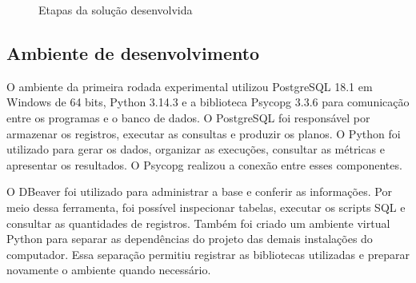 \documentclass{UNESC}
\newcommand{\fonteautor}{\par\smallskip{\footnotesize Fonte: elaboração própria.}}
\begin{document}
\begin{figure}[H]
\centering
\caption{Etapas da solução desenvolvida}
\label{fig:fluxo-solucao}
\fonteautor
\end{figure}

\subsection{Ambiente de desenvolvimento}

O ambiente da primeira rodada experimental utilizou PostgreSQL 18.1 em Windows de 64 bits, Python 3.14.3 e a biblioteca Psycopg 3.3.6 para comunicação entre os programas e o banco de dados. O PostgreSQL foi responsável por armazenar os registros, executar as consultas e produzir os planos. O Python foi utilizado para gerar os dados, organizar as execuções, consultar as métricas e apresentar os resultados. O Psycopg realizou a conexão entre esses componentes.

O DBeaver foi utilizado para administrar a base e conferir as informações. Por meio dessa ferramenta, foi possível inspecionar tabelas, executar os scripts SQL e consultar as quantidades de registros. Também foi criado um ambiente virtual Python para separar as dependências do projeto das demais instalações do computador. Essa separação permitiu registrar as bibliotecas utilizadas e preparar novamente o ambiente quando necessário.
\end{document}
